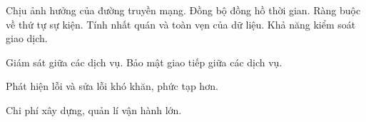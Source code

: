 
Chịu ảnh hưởng của đường truyền mạng.
Đồng bộ đồng hồ thời gian.
Ràng buộc về thứ tự sự kiện.
Tính nhất quán và toàn vẹn của dữ liệu.
Khả năng kiểm soát giao dịch.

Giám sát giữa các dịch vụ.
Bảo mật giao tiếp giữa các dịch vụ.


Phát hiện lỗi và sửa lỗi khó khăn, phức tạp hơn.




Chi phí xây dựng, quản lí vận hành lớn. 
 

